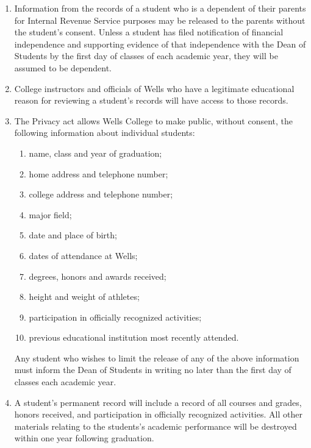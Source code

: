 \documentclass{manual}
\newcommand{\oldbreak}[1]{}
\newcommand{\itemLevelA}{\alph*.}
\newcommand{\itemLevelB}{\arabic*)}
\newcommand{\itemRefA}{\alph*}
\newcommand{\itemRefB}{\arabic*}
\begin{document}
\begin{enumerate}[label=\itemLevelA,ref=\itemRefA]
\begin{enumerate}[label=\itemLevelB,ref=\itemRefB]
\item Information from the records of a student who is a dependent of their parents for Internal Revenue Service purposes may be released to the parents without the student's consent. Unless a student has filed notification of financial independence and supporting evidence of that independence with the Dean of Students by the first day of classes of each academic year, they will be assumed to be dependent.

\item College instructors and officials of Wells who have a legitimate educational reason for reviewing a student's records will have access to those records.

\item The Privacy act allows Wells College to make public, without consent, the following information about individual students:
\begin{enumerate}[label=\alph*)]
\item name, class and year of graduation;
\item home address and telephone number;
\item college address and telephone number;
\item major field;
\item date and place of birth;
\item dates of attendance at Wells;
\item degrees, honors and awards received;
\item height and weight of athletes;
\item participation in officially recognized activities;
\item previous educational institution most recently attended.
\end{enumerate}

Any student who wishes to limit the release of any of the above information must inform the Dean of Students in writing no later than the first day of classes each academic year.

\item A student's permanent record will include a record of all courses and grades, honors received, and participation in officially recognized activities. All other materials relating to the students's academic performance will be destroyed within one year following graduation.

\end{enumerate}
\end{enumerate}
\oldbreak{VII-8}
\end{document}
